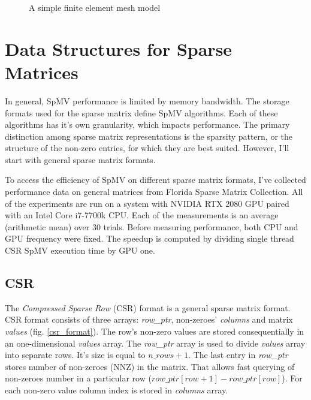 \documentclass{article}
\begin{document}
\begin{figure}[H]
{
  }
  \caption{A simple finite element mesh model}
  \label{fem_to_sparse_matrix}
\end{figure}




\section{Data Structures for Sparse Matrices}
In general, SpMV performance is limited by memory bandwidth. The storage formats used for the sparse matrix define SpMV algorithms. Each of these
algorithms has it's own granularity, which impacts performance. The primary distinction among sparse matrix representations is the 
sparsity pattern, or the structure of the non-zero entries, for which they are best suited. However, I'll start with general sparse matrix formats. 

To access the efficiency of SpMV on different sparse matrix formats, I've collected performance data on general matrices from
Florida Sparse Matrix Collection. All of the experiments are run on a system with NVIDIA RTX 2080 GPU paired with an Intel Core i7-7700k CPU. Each
of the measurements is an average (arithmetic mean) over 30 trials. Before measuring performance, both CPU and GPU frequency were fixed. The speedup is computed
by dividing single thread CSR SpMV execution time by GPU one.




\subsection{CSR}
The \textit{Compressed Sparse Row} (CSR) format is a general sparse matrix format. CSR format consists of three arrays: \textit{row\_ptr},
non-zeroes' \textit{columns} and matrix \textit{values} (fig. \ref{csr_format}). The row's non-zero values are stored consequentially in an one-dimensional \textit{values} array. The \textit{row\_ptr} array
is used to divide \textit{values} array into separate rows. It's size is equal to $n\_rows + 1$. The last entry in \textit{row\_ptr} stores number of non-zeroes (NNZ) in the
matrix. That allows fast querying of non-zeroes number in a particular row ($row\_ptr[row+1] - row\_ptr[row]$).
For each non-zero value column index is stored in \textit{columns} array.
\end{document}
